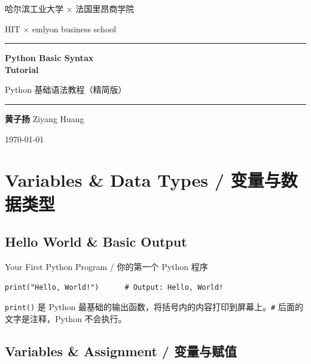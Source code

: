 \documentclass[11pt,a4paper]{report}
\let\oldtexttt\texttt
\renewcommand{\texttt}[1]{\textcolor{mainblue}{\oldtexttt{#1}}}
\begin{document}
\begin{titlepage}
\thispagestyle{empty}
\begin{center}
\vspace*{2cm}
{\large 哈尔滨工业大学 × 法国里昂商学院 \par}
\vspace{0.3cm}
{\large HIT × emlyon business school \par}
\vspace{1.5cm}
\rule{\linewidth}{0.5pt}
\vspace{1cm}
{\Huge\bfseries Python Basic Syntax \\[0.3em] Tutorial \par}
\vspace{0.5cm}
{\LARGE Python 基础语法教程（精简版）\par}
\vspace{1cm}
\rule{\linewidth}{0.5pt}
\vspace{1.5cm}
{\Large\textbf{黄子扬} \quad Ziyang Huang \par}
\vfill
{\large \today \par}
\end{center}
\end{titlepage}

\tableofcontents
\newpage

\chapter{Variables \& Data Types / 变量与数据类型}

\section{Hello World \& Basic Output}

\begin{concept}{Your First Python Program / 你的第一个 Python 程序}
\begin{lstlisting}
print("Hello, World!")      # Output: Hello, World!
\end{lstlisting}
\texttt{print()} 是 Python 最基础的输出函数，将括号内的内容打印到屏幕上。\texttt{\#} 后面的文字是注释，Python 不会执行。
\end{concept}

\section{Variables \& Assignment / 变量与赋值}
\end{document}
